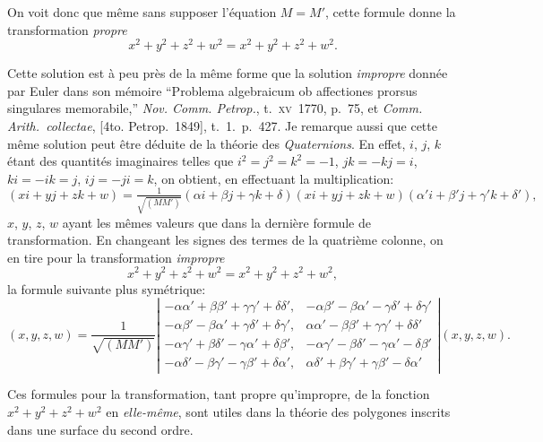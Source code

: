 \documentclass[11pt,a4paper]{article}
\begin{document}
\medskip

On voit donc que m\^eme sans supposer l'\'equation $M = M'$, cette formule donne la transformation \textit{propre}
\[
x^2 + y^2 + z^2 + w^2 = x^2 + y^2 + z^2 + w^2.
\]

\medskip

Cette solution est \`a peu pr\`es de la m\^eme forme que la solution \textit{impropre} donn\'ee par Euler dans son m\'emoire ``Problema algebraicum ob affectiones prorsus singulares memorabile,'' \textit{Nov. Comm. Petrop.}, t.\ \textsc{xv}\ 1770, p.\ 75, et \textit{Comm. Arith.\ collectae}, [4to. Petrop.\ 1849], t.\ 1.\ p.\ 427. Je remarque aussi que cette m\^eme solution peut \^etre d\'eduite de la th\'eorie des \textit{Quaternions}. En effet, $i$, $j$, $k$ \'etant des quantit\'es imaginaires telles que $i^2 = j^2 = k^2 = -1$, $jk = -kj = i$, $ki = -ik = j$, $ij = -ji = k$, on obtient, en effectuant la multiplication:
\[
(xi + yj + zk + w) = \tfrac{1}{\sqrt{(MM')}}(\alpha i + \beta j + \gamma k + \delta)(xi + yj + zk + w)(\alpha' i + \beta' j + \gamma' k + \delta'),
\]
$x$, $y$, $z$, $w$ ayant les m\^emes valeurs que dans la derni\`ere formule de transformation. En changeant les signes des termes de la quatri\`eme colonne, on en tire pour la transformation \textit{impropre}
\[
x^2 + y^2 + z^2 + w^2 = x^2 + y^2 + z^2 + w^2,
\]
la formule suivante plus sym\'etrique:
\[
(x, y, z, w) = \frac{1}{\sqrt{(MM')}}\left\lvert\begin{array}{cccc}
-\alpha\alpha' + \beta\beta' + \gamma\gamma' + \delta\delta',& -\alpha\beta' - \beta\alpha' - \gamma\delta' + \delta\gamma'\\
-\alpha\beta' - \beta\alpha' + \gamma\delta' + \delta\gamma',& \alpha\alpha' - \beta\beta' + \gamma\gamma' + \delta\delta'\\
-\alpha\gamma' + \beta\delta' - \gamma\alpha' + \delta\beta',& -\alpha\gamma' - \beta\delta' - \gamma\alpha' - \delta\beta'\\
-\alpha\delta' - \beta\gamma' - \gamma\beta' + \delta\alpha',& \alpha\delta' + \beta\gamma' + \gamma\beta' - \delta\alpha'
\end{array}\right\rvert (x, y, z, w).
\]

\medskip

Ces formules pour la transformation, tant propre qu'impropre, de la fonction $x^2 + y^2 + z^2 + w^2$ en \textit{elle-m\^eme}, sont utiles dans la th\'eorie des polygones inscrits dans une surface du second ordre.

\end{document}
